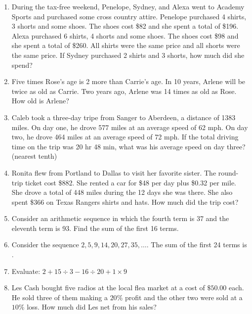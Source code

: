 \documentclass[../uilmath.tex]{subfiles}
\begin{document}
\begin{enumerate}[label=\bfseries\arabic*.]
        \item %
        During the tax-free weekend, Penelope, Sydney, and Alexa went to Academy Sports and purchased some cross country attire. Penelope purchased 4 shirts, 3 shorts and some shoes. 
        The shoes cost \$82 and she spent a total of \$196. Alexa purchased 6 shirts, 4 shorts and some shoes. The shoes cost \$98 and she spent a total of \$260. All shirts were the same price and all shorts were the same price. 
        If Sydney purchased 2 shirts and 3 shorts, how much did she spend?

        \item %
        Five times Rose's age is 2 more than Carrie's age. In 10 years, Arlene will be twice as old as Carrie. Two years ago, Arlene was 14 times as old as Rose. How old is Arlene?

        \item %
        Caleb took a three-day tripe from Sanger to Aberdeen, a distance of 1383 miles. On day one, he drove 577 miles at an average speed of 62 mph. On day two, he drove 464 miles at an average speed of 72 mph. If the total driving time on the trip was 20 hr 48 min, what was his average speed on day three? (nearest tenth)

        \item %
        Ronita flew from Portland to Dallas to visit her favorite sister. The round-trip ticket cost \$882. She rented a car for \$48 per day plus \$0.32 per mile. She drove a total of 448 miles during the 12 days she was there. She also spent \$366 on Texas Rangers shirts and hats. How much did the trip cost?

        \item %
        Consider an arithmetic sequence in which the fourth term is 37 and the eleventh term is 93. Find the sum of the first 16 terms.

        \item %
        Consider the sequence $2,5,9,14,20,27,35,\dots$. The sum of the first 24 terms is \blank.

        \item %
        Evaluate: $2+15\div 3-16\div 20+1\times 9$

        \item %
        Les Cash bought five radios at the local flea market at a cost of $\$50.00$ each. He sold three of them making a $20\%$ profit and the other two were sold at a $10\%$ loss. 
        How much did Les net from his sales?


\end{enumerate}
\end{document}
